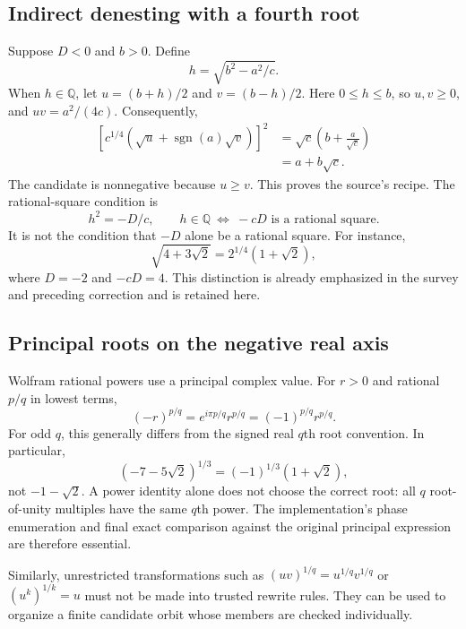 \documentclass[11pt,a4paper]{article}
\newcommand{\Q}{\mathbb Q}\newcommand{\C}{\mathbb C}
\theoremstyle{definition}\newtheorem{definition}[proposition]{Definition}
\theoremstyle{remark}\newtheorem{remark}[proposition]{Remark}
\begin{document}
\subsection{Indirect denesting with a fourth root}
Suppose $D<0$ and $b>0$. Define
\begin{equation}
 h=\sqrt{b^2-a^2/c}.
\end{equation}
When $h\in\Q$, let $u=(b+h)/2$ and $v=(b-h)/2$. Here $0\le h\le b$, so
$u,v\ge0$, and $uv=a^2/(4c)$. Consequently,
\begin{align}
 \left[c^{1/4}\left(\sqrt u+\operatorname{sgn}(a)\sqrt v\right)\right]^2
 &=\sqrt c\left(b+\frac a{\sqrt c}\right)\\
 &=a+b\sqrt c.
\end{align}
The candidate is nonnegative because $u\ge v$. This proves the source's recipe.
The rational-square condition is
\begin{equation}
 h^2=-D/c,\qquad
 h\in\Q\ \Longleftrightarrow\ -cD\text{ is a rational square}.
\end{equation}
It is not the condition that $-D$ alone be a rational square. For instance,
\begin{equation}
 \sqrt{4+3\sqrt2}=2^{1/4}(1+\sqrt2),
\end{equation}
where $D=-2$ and $-cD=4$. This distinction is already emphasized in the survey
and preceding correction and is retained here.\cite{survey,prior,bfht}

\subsection{Principal roots on the negative real axis}
Wolfram rational powers use a principal complex value. For $r>0$ and rational
$p/q$ in lowest terms,
\begin{equation}
 (-r)^{p/q}=e^{i\pi p/q}r^{p/q}=(-1)^{p/q}r^{p/q}.
\end{equation}
For odd $q$, this generally differs from the signed real $q$th root convention.
In particular,
\begin{equation}
 (-7-5\sqrt2)^{1/3}=(-1)^{1/3}(1+\sqrt2),
\end{equation}
not $-1-\sqrt2$. A power identity alone does not choose the correct root:
all $q$ root-of-unity multiples have the same $q$th power. The implementation's
phase enumeration and final exact comparison against the original principal
expression are therefore essential.

Similarly, unrestricted transformations such as
$(uv)^{1/q}=u^{1/q}v^{1/q}$ or $(u^k)^{1/k}=u$ must not be made into trusted
rewrite rules. They can be used to organize a finite candidate orbit whose
members are checked individually.
\end{document}
